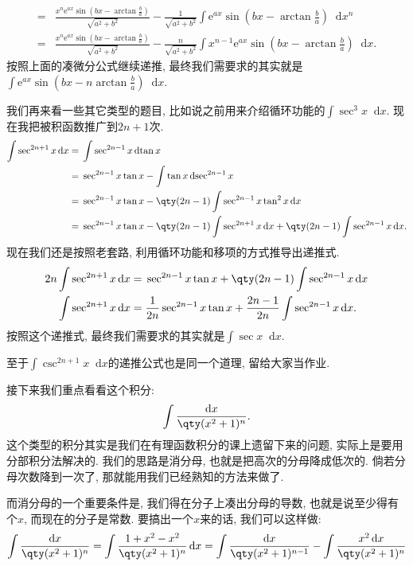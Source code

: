 \documentclass{ctexbook}
\newcommand{\e}{\mathrm{e}}
\newcommand*{\dif}{\mathop{}\!\mathrm{d}}
\begin{document}
{\begin{align*}
={}&\frac{x^{n}\e^{ax}\sin(bx-\arctan{\frac{b}{a}})}{\sqrt{a^{2}+b^{2}}}-\frac{1}{\sqrt{a^{2}+b^{2}}}\int\e^{ax}\sin(bx-\arctan{\frac{b}{a}})\dif{x^{n}}\\
={}&\frac{x^{n}\e^{ax}\sin(bx-\arctan{\frac{b}{a}})}{\sqrt{a^{2}+b^{2}}}-\frac{n}{\sqrt{a^{2}+b^{2}}}\int x^{n-1}\e^{ax}\sin(bx-\arctan{\frac{b}{a}})\dif{x}
.\end{align*}
按照上面的凑微分公式继续递推, 最终我们需要求的其实就是$\int\e^{ax}\sin(bx-n\arctan{\frac{b}{a}})\dif{x}$. \par
我们再来看一些其它类型的题目, 比如说之前用来介绍循环功能的$\int\sec^{3}{x}\dif{x}$. 现在我把被积函数推广到$2n+1$次. 
\begin{align*}
\int\sec^{2n+1}{x}\dif{x}={}&\int\sec^{2n-1}{x}\dif{\tan{x}}\\
={}&\sec^{2n-1}{x}\tan{x}-\int\tan{x}\dif{\sec^{2n-1}{x}}\\
={}&\sec^{2n-1}{x}\tan{x}-\qty(2n-1)\int\sec^{2n-1}{x}\tan^{2}{x}\dif{x}\\
={}&\sec^{2n-1}{x}\tan{x}-\qty(2n-1)\int\sec^{2n+1}{x}\dif{x}+\qty(2n-1)\int\sec^{2n-1}{x}\dif{x}
.\end{align*}
现在我们还是按照老套路, 利用循环功能和移项的方式推导出递推式. 
\begin{align*}
2n\int\sec^{2n+1}{x}\dif{x}={}&\sec^{2n-1}{x}\tan{x}+\qty(2n-1)\int\sec^{2n-1}{x}\dif{x}\\
\int\sec^{2n+1}{x}\dif{x}={}&\frac{1}{2n}\sec^{2n-1}{x}\tan{x}+\frac{2n-1}{2n}\int\sec^{2n-1}{x}\dif{x}
.\end{align*}
按照这个递推式, 最终我们需要求的其实就是$\int\sec{x}\dif{x}$. \par
至于$\int\csc^{2n+1}{x}\dif{x}$的递推公式也是同一个道理, 留给大家当作业. \par
接下来我们重点看看这个积分: 
\begin{align*}
\int\frac{\dif{x}}{\qty(x^{2}+1)^{n}}
.\end{align*}
这个类型的积分其实是我们在有理函数积分的课上遗留下来的问题, 实际上是要用分部积分法解决的. 我们的思路是消分母, 也就是把高次的分母降成低次的. 倘若分母次数降到一次了, 那就能用我们已经熟知的方法来做了. \par
而消分母的一个重要条件是, 我们得在分子上凑出分母的导数, 也就是说至少得有个$x$, 而现在的分子是常数. 要搞出一个$x$来的话, 我们可以这样做: 
\begin{align*}
\int\frac{\dif{x}}{\qty(x^{2}+1)^{n}}=\int\frac{1+x^{2}-x^{2}}{\qty(x^{2}+1)^{n}}\dif{x}=\int\frac{\dif{x}}{\qty(x^{2}+1)^{n-1}}-\int\frac{x^{2}\dif{x}}{\qty(x^{2}+1)^{n}}

\end{align*}}
\end{document}
